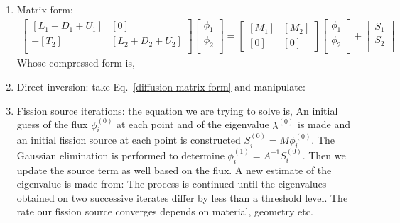 \documentclass{school-22.211-notes}
\begin{document}
\begin{enumerate}
\begin{enumerate}
\item Matrix form: 
  \begin{align}
    \left[ \begin{array}{cc} 
        [L_1 + D_1 + U_1] & [0] \\
        -[T_2] & [L_2 + D_2 + U_2] \\
      \end{array} \right] 
    \left[ \begin{array}{c}
        \phi_1 \\ \phi_2 \\ \end{array} \right] 
    = \left[ {\begin{array}{cc} \left[M_1\right] & \left[M_2\right] \\ \left[0\right] & \left[0\right] \end{array}} \right] 
    \left[ \begin{array}{c}
        \phi_1 \\ \phi_2 \\ \end{array} \right] 
    + 
    \left[ \begin{array}{c} 
        S_1 \\ S_2 \\ \end{array} \right] 
  \end{align}
  Whose compressed form is, 
  \eqn{ [A] [\phi] = [M] [\phi] + [S] \label{diffusion-matrix-form} }

\item Direct inversion: take Eq.~\ref{diffusion-matrix-form} and manipulate:
  
\item Fission source iterations: the equation we are trying to solve is,
An initial guess of the flux $\phi_i^{(0)}$ at each point and of the eigenvalue $\lambda^{(0)}$ is made and an initial fission source at each point is constructed $S_i^{(0)} = M \phi_i^{(0)}$. The Gaussian elimination is performed to determine $\phi_i^{(1)} = A^{-1} S_i^{(0)}$. Then we update the source term as well based on the flux. A new estimate of the eigenvalue is made from: 
The process is continued until the eigenvalues obtained on two successive iterates differ by less than a threshold level. The rate our fission source converges depends on material, geometry etc.


\end{enumerate}
\end{enumerate}
\end{document}
